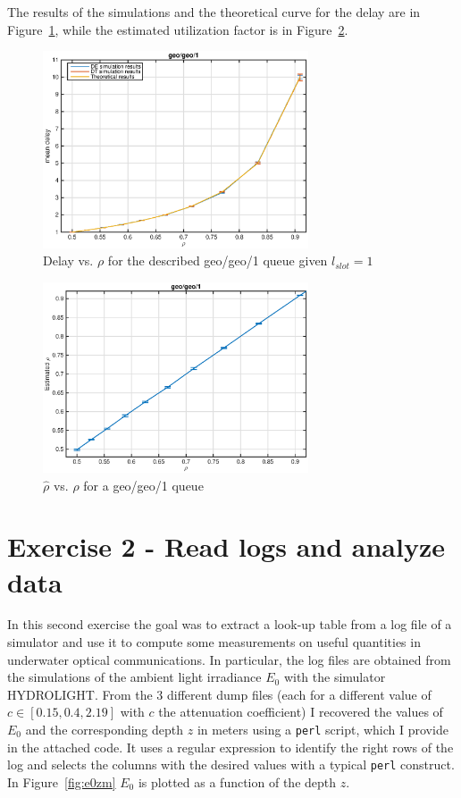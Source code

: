 \documentclass[10pt]{article}
\begin{document}
The results of the simulations and the theoretical curve for the delay are in Figure~\ref{fig:gg1_dl}, while the estimated utilization factor is in Figure~\ref{fig:gg1_rho}.

\begin{figure}[h!]
	\centering
	\includegraphics[width = 0.7\textwidth]{gg1_dl}
	\caption{Delay vs. $\rho$ for the described geo/geo/1 queue given $l_{slot} = 1$}
	\label{fig:gg1_dl}
\end{figure}

\clearpage


\begin{figure}[h!]
	\centering
	\includegraphics[width = 0.7\textwidth]{gg1_rho}
	\caption{$\hat{\rho}$ vs. $\rho$ for a geo/geo/1 queue}
	\label{fig:gg1_rho}
\end{figure}



\section*{Exercise 2 - Read logs and analyze data}
In this second exercise the goal was to extract a look-up table from a log file of a simulator and use it to compute some measurements on useful quantities in underwater optical communications. In particular, the log files are obtained from the simulations of the ambient light irradiance $E_0$ with the simulator HYDROLIGHT. From the 3 different dump files (each for a different value of $c \in [0.15, 0.4, 2.19]$ with $c$ the attenuation coefficient) I recovered the values of $E_0$ and the corresponding depth $z$ in meters using a \texttt{perl} script, which I provide in the attached code. It uses a regular expression to identify the right rows of the log and selects the columns with the desired values with a typical \texttt{perl} construct. In Figure~\ref{fig:e0zm} $E_0$ is plotted as a function of the depth $z$.
\end{document}
